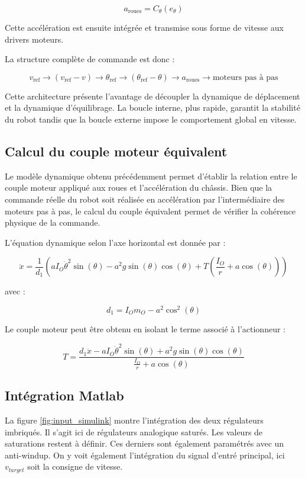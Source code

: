 $$
a_{\mathrm{roues}} = C_{\theta}(e_{\theta})
$$

Cette accélération est ensuite intégrée et transmise sous forme de vitesse aux drivers moteurs.

La structure complète de commande est donc :

$$
v_{\mathrm{ref}}
\rightarrow
(v_{\mathrm{ref}}-v)
\rightarrow
\theta_{\mathrm{ref}}
\rightarrow
(\theta_{\mathrm{ref}}-\theta)
\rightarrow
a_{\mathrm{roues}}
\rightarrow
\text{moteurs pas à pas}
$$

Cette architecture présente l'avantage de découpler la dynamique de déplacement et la dynamique d'équilibrage. La boucle interne, plus rapide, garantit la stabilité du robot tandis que la boucle externe impose le comportement global en vitesse.
\subsection{Calcul du couple moteur équivalent}

Le modèle dynamique obtenu précédemment permet d'établir la relation entre le couple moteur appliqué aux roues et l'accélération du châssis. Bien que la commande réelle du robot soit réalisée en accélération par l'intermédiaire des moteurs pas à pas, le calcul du couple équivalent permet de vérifier la cohérence physique de la commande.

L'équation dynamique selon l'axe horizontal est donnée par :

\[
\ddot{x} =
\frac{1}{d_1}
\left(
aI_O\dot{\theta}^2\sin(\theta)
-
a^2g\sin(\theta)\cos(\theta)
+
T
\left(
\frac{I_O}{r}+a\cos(\theta)
\right)
\right)
\]

avec :

\[
d_1=I_Om_O-a^2\cos^2(\theta)
\]

Le couple moteur peut être obtenu en isolant le terme associé à l'actionneur :

\[
T=
\frac{
d_1\ddot{x}
-
aI_O\dot{\theta}^2\sin(\theta)
+
a^2g\sin(\theta)\cos(\theta)
}
{
\frac{I_O}{r}+a\cos(\theta)
}
\]


\subsection{Intégration Matlab}

La figure \ref{fig:input_simulink} montre l'intégration des deux régulateurs imbriqués. Il s'agit ici de régulateurs analogique saturés. Les valeurs de saturations
restent à définir.
Ces derniers sont également paramétrés avec un anti-windup.
On y voit également l'intégration du signal d'entré principal, ici $v_{target}$ soit la consigne de vitesse.

